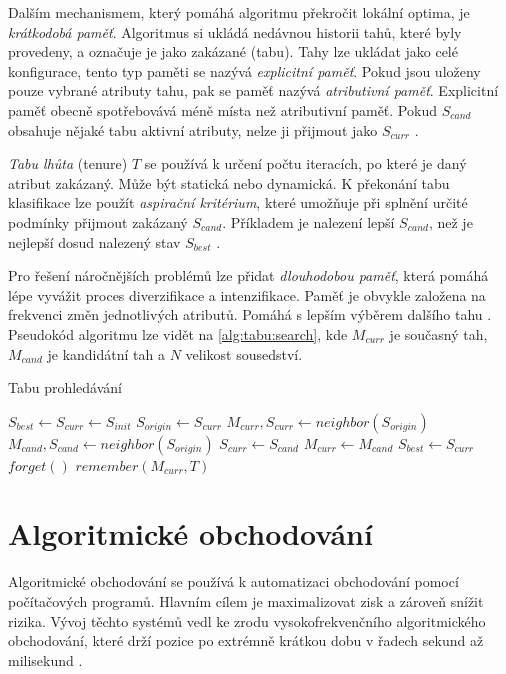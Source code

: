 Dalším mechanismem, který pomáhá algoritmu překročit lokální optima, je \textit{krátkodobá paměť}.
Algoritmus si ukládá nedávnou historii tahů, které byly provedeny, a označuje je jako zakázané (tabu).
Tahy lze ukládat jako celé konfigurace, tento typ paměti se nazývá \textit{explicitní paměť}.
Pokud jsou uloženy pouze vybrané atributy tahu, pak se paměť nazývá \textit{atributivní paměť}.
Explicitní paměť obecně spotřebovává méně místa než atributivní paměť.
Pokud $S_{cand}$ obsahuje nějaké tabu aktivní atributy, nelze ji přijmout jako $S_{curr}$ \cite{laguna}.

\textit{Tabu lhůta} (tenure) $T$ se používá k určení počtu iteracích, po které je daný atribut zakázaný.
Může být statická nebo dynamická.
K překonání tabu klasifikace lze použít \textit{aspirační kritérium}, které umožňuje při splnění určité podmínky přijmout zakázaný $S_{cand}$.
Příkladem je nalezení lepší $S_{cand}$, než je nejlepší dosud nalezený stav $S_{best}$ \cite{laguna}.

Pro řešení náročnějších problémů lze přidat \textit{dlouhodobou paměť}, která pomáhá lépe vyvážit proces diverzifikace a intenzifikace.
Paměť je obvykle založena na frekvenci změn jednotlivých atributů.
Pomáhá s lepším výběrem dalšího tahu \cite{laguna}.
Pseudokód algoritmu lze vidět na \ref{alg:tabu:search}, kde $M_{curr}$ je současný tah, $M_{cand}$ je kandidátní tah a $N$ velikost sousedství.

\begin{algorithm}
\caption{Tabu prohledávání}\label{alg:tabu:search}
\begin{algorithmic}
\State $S_{best} \gets S_{curr} \gets S_{init}$
    \State $S_{origin} \gets S_{curr}$
    \State $M_{curr}, S_{curr} \gets neighbor(S_{origin})$
     
        \State $M_{cand}, S_{cand} \gets neighbor(S_{origin})$
            \State $S_{curr} \gets S_{cand}$
            \State $M_{curr} \gets M_{cand}$
        \EndIf
    \EndFor
        \State $S_{best} \gets S_{curr}$
    \EndIf
    \State $forget()$
    \State $remember(M_{curr}, T)$
\EndWhile
\State {}
\end{algorithmic}
\end{algorithm}

\chapter{Algoritmické obchodování}
Algoritmické obchodování se používá k automatizaci obchodování pomocí počítačových programů.
Hlavním cílem je maximalizovat zisk a zároveň snížit rizika.
Vývoj těchto systémů vedl ke zrodu vysokofrekvenčního algoritmického obchodování, které drží pozice po extrémně krátkou dobu v řadech sekund až milisekund \cite{nuti, treleaven}.

